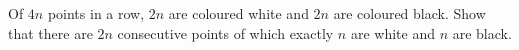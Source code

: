 Of $4n$ points in a row, $2n$ are coloured white and $2n$ are coloured black.
Show that there are $2n$ consecutive points of which exactly $n$ are white and $n$ are black.